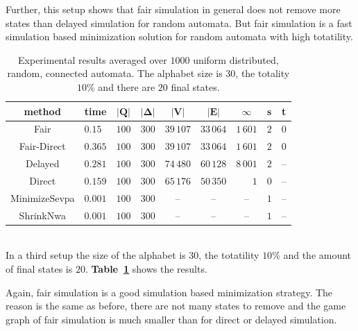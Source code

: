 \documentclass[12pt,oneside,bibliography=totoc,abstracton]{scrartcl}
\newcommand{\emptyccell}{\multicolumn{1}{c}{--}}
\newcommand{\emptyccellrightended}{\multicolumn{1}{c|}{--}}
\newcommand{\tableref}[1]{\textbf{Table~\ref{#1}}}
\begin{document}
Further, this setup shows that fair simulation in general does not remove more states than delayed
simulation for random automata. But fair simulation is a fast simulation based minimization solution for random
automata with high totatility.
\begin{table}[h]
	 \begin{center}
		\begin{tabular}{|c|lrrrrrrr|}
			\hline
			\multicolumn{1}{|c|}{\cellcolor{black!30}\textbf{method}}
			&\multicolumn{1}{c}{\cellcolor{black!30}\textbf{time}}
			&\multicolumn{1}{c}{\cellcolor{black!30}$\bm{|Q|}$}
			&\multicolumn{1}{c}{\cellcolor{black!30}$\bm{|\Delta|}$}
			&\multicolumn{1}{c}{\cellcolor{black!30}$\bm{|V|}$}
			&\multicolumn{1}{c}{\cellcolor{black!30}$\bm{|E|}$}
			&\multicolumn{1}{c}{\cellcolor{black!30}$\bm{\infty}$}
			&\multicolumn{1}{c}{\cellcolor{black!30}\textbf{s}}
			&\multicolumn{1}{c|}{\cellcolor{black!30}\textbf{t}}\\
			\hline
			Fair			&$0.15$	&$100$	&$300$	&$39\,107$	&$33\,064$	&$1\,601$	&$2$	&$0$\\
			Fair-Direct		&$0.365$	&$100$	&$300$	&$39\,107$	&$33\,064$	&$1\,601$	&$2$	&$0$\\
			Delayed		&$0.281$	&$100$	&$300$	&$74\,480$	&$60\,128$	&$8\,001$	&$2$	&\emptyccellrightended\\
			Direct			&$0.159$	&$100$	&$300$	&$65\,176$	&$50\,350$	&$1$		&$0$	&\emptyccellrightended\\
			MinimizeSevpa	&$0.001$	&$100$	&$300$	&\emptyccell	&\emptyccell	&\emptyccell	&$1$	&\emptyccellrightended\\
			ShrinkNwa		&$0.001$	&$100$	&$300$	&\emptyccell	&\emptyccell	&\emptyccell	&$1$	&\emptyccellrightended\\
			\hline
		\end{tabular}
	\end{center}
	\caption{Experimental results averaged over $1000$ uniform distributed, random, connected automata.
		The alphabet size is $30$, the totality $10$\% and there are $20$ final states.}
	\label{random30alphabet}
\end{table}\quad\\
In a third setup the size of the alphabet is $30$, the totatility $10$\% and the amount of final states is $20$.
\tableref{random30alphabet} shows the results.

Again, fair simulation is a good simulation based minimization strategy.
The reason is the same as before, there are not many states to remove and the game graph of fair simulation is much
smaller than for direct or delayed simulation.
\end{document}
